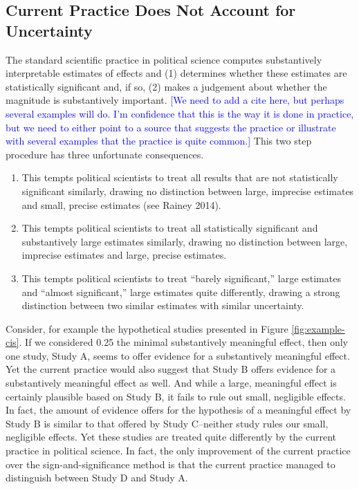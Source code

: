 \documentclass[12pt]{article}
\newcommand{\kelly}[1]{\textcolor{blue}{#1}}
\begin{document}
\subsection*{Current Practice Does Not Account for Uncertainty}

The standard scientific practice in political science computes substantively interpretable estimates of effects and (1) determines whether these estimates are statistically significant and, if so, (2) makes a judgement about whether the magnitude is substantively important. \kelly{[We need to add a cite here, but perhaps several examples will do. I'm confidence that this is the way it is done in practice, but we need to either point to a source that suggests the practice or illustrate with several examples that the practice is quite common.]} This two step procedure has three unfortunate consequences.
\singlespace
\begin{enumerate}
\item This tempts political scientists to treat all results that are not statistically significant similarly, drawing no distinction between large, imprecise estimates and small, precise estimates (see Rainey 2014).
\item This tempts political scientists to treat all statistically significant and substantively large estimates similarly, drawing no distinction between large, imprecise estimates and large, precise estimates.
\item This tempts political scientists to treat ``barely significant,'' large estimates and ``almost significant,'' large estimates quite differently, drawing a strong distinction between two similar estimates with similar uncertainty.
\end{enumerate}
\doublespace

Consider, for example the hypothetical studies presented in Figure \ref{fig:example-cis}. If we considered 0.25 the minimal substantively meaningful effect, then only one study, Study A, seems to offer evidence for a substantively meaningful effect. Yet the current practice would also suggest that Study B offers evidence for a substantively meaningful effect as well. And while a large, meaningful effect is certainly plausible based on Study B, it fails to rule out small, negligible effects. In fact, the amount of evidence offers for the hypothesis of a meaningful effect by Study B is similar to that offered by Study C--neither study rules our small, negligible effects. Yet these studies are treated quite differently by the current practice in political science. In fact, the only improvement of the current practice over the sign-and-significance method is that the current practice managed to distinguish between Study D and Study A.
\end{document}
